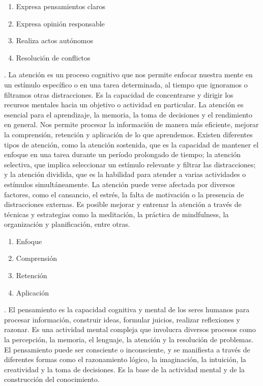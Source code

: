 \documentclass[12pt,a4paper]{article}
\begin{document}
\begin{enumerate}
\item Expresa pensamientos claros
\item Expresa opinión responsable
\item Realiza actos autónomos
\item Resolución de conflictos
\end{enumerate}
\noindent\textbf{\dimddd}.	La atención es un proceso cognitivo que nos permite enfocar nuestra mente en un estímulo específico o en una tarea determinada, al tiempo que ignoramos o filtramos otras distracciones. Es la capacidad de concentrarse y dirigir los recursos mentales hacia un objetivo o actividad en particular.
La atención es esencial para el aprendizaje, la memoria, la toma de decisiones y el rendimiento en general. Nos permite procesar la información de manera más eficiente, mejorar la comprensión, retención y aplicación de lo que aprendemos.
Existen diferentes tipos de atención, como la atención sostenida, que es la capacidad de mantener el enfoque en una tarea durante un período prolongado de tiempo; la atención selectiva, que implica seleccionar un estímulo relevante y filtrar las distracciones; y la atención dividida, que es la habilidad para atender a varias actividades o estímulos simultáneamente.
La atención puede verse afectada por diversos factores, como el cansancio, el estrés, la falta de motivación o la presencia de distracciones externas. Es posible mejorar y entrenar la atención a través de técnicas y estrategias como la meditación, la práctica de mindfulness, la organización y planificación, entre otras.

\begin{enumerate}
\item Enfoque
\item Comprensión
\item Retención
\item Aplicación
\end{enumerate}

\noindent\textbf{\dimdddd}. El pensamiento es la capacidad cognitiva y mental de los seres humanos para procesar información, construir ideas, formular juicios, realizar reflexiones y razonar. Es una actividad mental compleja que involucra diversos procesos como la percepción, la memoria, el lenguaje, la atención y la resolución de problemas. El pensamiento puede ser consciente o inconsciente, y se manifiesta a través de diferentes formas como el razonamiento lógico, la imaginación, la intuición, la creatividad y la toma de decisiones. Es la base de la actividad mental y de la construcción del conocimiento.
\end{document}
